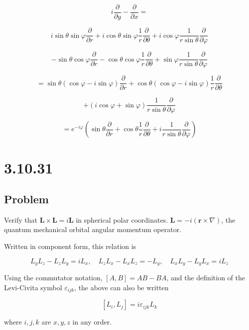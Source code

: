 \documentclass[12pt]{article}
\begin{document}
\[
    i \frac{\partial}{\partial y} - \frac{\partial}{\partial x} =
\]

\[
    i  \sin{\theta} \sin{\varphi} \frac{\partial}{\partial r}
    + i \cos{\theta} \sin{\varphi} \frac{1}{r} \frac{\partial}{\partial \theta}
    + i \cos{\varphi} \frac{1}{r \sin{\theta}} \frac{\partial}{\partial \varphi}
\]

\[
    - \sin{\theta} \cos{\varphi} \frac{\partial}{\partial r}
    - \cos{\theta} \cos{\varphi} \frac{1}{r} \frac{\partial}{\partial \theta}
    + \sin{\varphi} \frac{1}{r \sin{\theta}} \frac{\partial}{\partial \varphi}
\]

\[
    = \sin{\theta} \left(\cos{\varphi} - i \sin{\varphi}\right)
    \frac{\partial}{\partial r} + \cos{\theta} \left(\cos{\varphi} - i \sin{\varphi}\right)
    \frac{1}{r} \frac{\partial}{\partial \theta}
\]

\[
    + \left(i \cos{\varphi} + \sin{\varphi}\right) \frac{1}{r \sin{\theta}} \frac{\partial}{\partial \varphi}
\]

\[
    = e^{-i \varphi}
    \left(
    \sin{\theta} \frac{\partial}{\partial r} + \cos{\theta} \frac{1}{r} \frac{\partial}{\partial \theta}
    + i \frac{1}{r \sin{\theta}} \frac{\partial}{\partial \varphi}
    \right)
\]

\section{3.10.31}

\subsection{Problem}

Verify that \(\textbf{L} \times \textbf{L} = i \textbf{L}\) in spherical polar coordinates.
\(\textbf{L} = -i \left(\textbf{r} \times \nabla\right)\), the quantum mechanical orbital angular
momentum operator.

Written in component form, this relation is

\[
    L_y L_z - L_z L_y = i L_x , \quad L_z L_x - L_x L_z = -L_y ,\quad L_x L_y - L_y L_x = i L_z
\]

Using the commutator notation, \([A, B] = AB - BA\), and the definition of the Levi-Civita symbol
\(\varepsilon_{ijk}\), the above can also be written

\[
    [L_i, L_j] = i \varepsilon_{ijk} L_k
\]

where \(i , j , k\) are \(x, y, z\) in any order.
\end{document}

